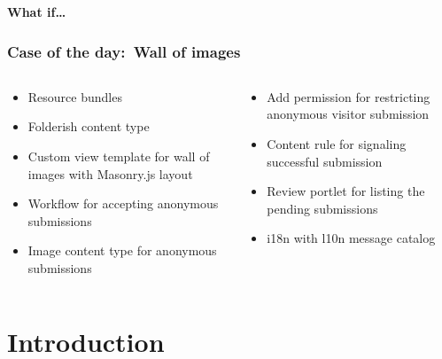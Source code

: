 \documentclass[aspectratio=43]{beamer}
\begin{document}
\begin{frame}[plain,c]
  \huge
  \bfseries
  \centering
  \vspace{1cm}
  What if\ldots
\end{frame}





\begin{frame}[plain,t]
  \frametitle{Case of the day:\ Wall of images}
  \begin{columns}[onlytextwidth,t]
  \begin{column}{0.45\textwidth}
  \begin{itemize}[<+->]
  \setlength{\itemsep}{1em}
  \item Resource bundles
  \item Folderish content type
  \item Custom view template for wall of images with Masonry.js layout
  \item Workflow for accepting anonymous submissions
  \item Image content type for anonymous submissions
  \end{itemize}
  \end{column}
  \begin{column}{0.45\textwidth}
  \begin{itemize}[<+->]
  \setlength{\itemsep}{1em}
  \item Add permission for restricting anonymous visitor submission
  \item Content rule for signaling successful submission
  \item Review portlet for listing the pending submissions
  \item i18n with l10n message catalog
  \end{itemize}
  \end{column}
  \end{columns}
\end{frame}

\section{Introduction}
\end{document}
